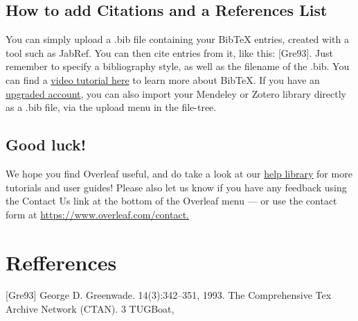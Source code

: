 \documentclass{article}
\begin{document}
\subsection{How to add Citations and a References List}
You can simply upload a .bib file containing your BibTeX entries, created with a tool such as JabRef.
You can then cite entries from it, like this: [Gre93]. Just remember to specify a bibliography style, as
well as the filename of the .bib. You can find a \href{https://www.overleaf.com/help/97-how-to-include-a-bibliography-using-bibtex}{ video tutorial here} to learn more about BibTeX.
If you have an \href{https://www.overleaf.com/user/subscription/plans}{ upgraded account}, you can also import your Mendeley or Zotero library directly as
a .bib file, via the upload menu in the file-tree.
\subsection{Good luck!}
We hope you find Overleaf useful, and do take a look at our \href{https://www.overleaf.com/learn} {help library} for more tutorials and user
guides! Please also let us know if you have any feedback using the Contact Us link at the bottom of
the Overleaf menu — or use the contact form at \href{https://www.overleaf.com/contact} {https://www.overleaf.com/contact.}

\section{Refferences}
[Gre93] George D. Greenwade.
14(3):342–351, 1993.
The Comprehensive Tex Archive Network (CTAN).
3
TUGBoat,
\end{document}
